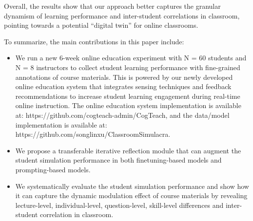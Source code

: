{%
}
Overall, the results show that our approach better captures the granular dynamism of learning performance and inter-student correlations in classroom, pointing towards a potential ``digital twin'' for online classrooms.

To summarize, the main contributions in this paper include:

\begin{itemize}
    \item We run a new 6-week online education experiment with N = 60 students and N = 8 instructors to collect student learning performance with fine-grained annotations of course materials. This is powered by our newly developed online education system that integrates sensing techniques and feedback recommendations to increase student learning engagement during real-time online instruction. The online education system implementation is available at: https://github.com/cogteach-admin/CogTeach, and the data/model implementation is available at: https://github.com/songlinxu/ClassroomSimulacra.
    \item We propose a transferable iterative reflection module that can augment the student simulation performance in both finetuning-based models and prompting-based models.
    \item We systematically evaluate the student simulation performance and show how it can capture the dynamic modulation effect of course materials by revealing lecture-level, individual-level, question-level, skill-level differences and inter-student correlation in classroom.
\end{itemize}



